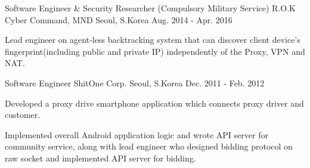 \begin{cventries}
    \cventry
    {Software Engineer \& Security Researcher (Compulsory Military Service)} %
    {R.O.K Cyber Command, MND} %
    {Seoul, S.Korea} %
    {Aug. 2014 - Apr. 2016} %
    {
        \begin{cvitems} %
            \item {Lead engineer on agent-less backtracking system that can discover client device's fingerprint(including public and private IP) independently of the Proxy, VPN and NAT.}
        \end{cvitems}
    }

    \cventry
    {Software Engineer} %
    {ShitOne Corp.} %
    {Seoul, S.Korea} %
    {Dec. 2011 - Feb. 2012} %
    {
        \begin{cvitems} %
            \item {Developed a proxy drive smartphone application which connects proxy driver and customer.}
            \item {Implemented overall Android application logic and wrote API server for community service, along with lead engineer who designed bidding protocol on raw socket and implemented API server for bidding.}
        \end{cvitems}
    }

\end{cventries}

